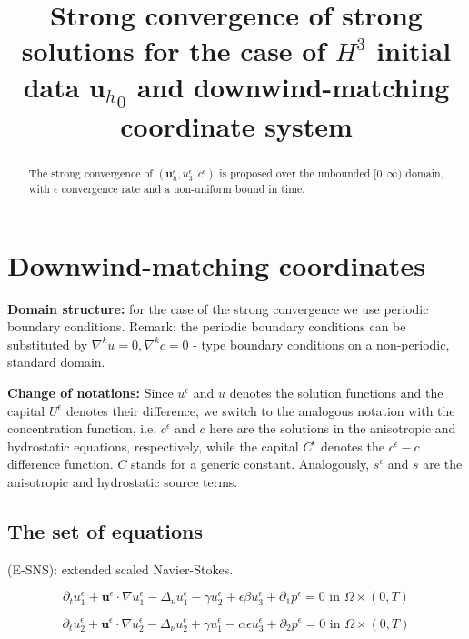 \documentclass[11pt]{article}
\title{Strong convergence of strong solutions for the case of $H^3$ initial data ${\mathbf{u}_h}_0$ and downwind-matching coordinate system}
\date{}
\begin{document}
\maketitle

\begin{abstract}

The strong convergence of $(\mathbf{u}_h^\epsilon, u_3^\epsilon, c^\epsilon)$ is proposed over the unbounded $[0, \infty)$ domain, with $\epsilon$ convergence rate and a non-uniform bound in time.

\end{abstract}

\newpage
\tableofcontents
\newpage

\section{Downwind-matching coordinates}

\textbf{Domain structure:} for the case of the strong convergence we use periodic boundary conditions. Remark: the periodic boundary conditions can be substituted by $\nabla^k u = 0, \nabla^k c = 0$ - type boundary conditions on a non-periodic, standard domain.

\textbf{Change of notations:} Since $u^\epsilon$ and $u$ denotes the solution functions and the capital $U^\epsilon$ denotes their difference, we switch to the analogous notation with the concentration function, i.e. $c^\epsilon$ and $c$ here are the solutions in the anisotropic and hydrostatic equations, respectively, while the capital $C^\epsilon$ denotes the $c^\epsilon - c$ difference function. $C$ stands for a generic constant. Analogously, $s^\epsilon$ and $s$ are the anisotropic and hydrostatic source terms.

\subsection{The set of equations}

(E-SNS): extended scaled Navier-Stokes.

    \begin{equation} \label{ANSC1-dw}
    \partial_t u^\epsilon _1 + \mathbf{u}^\epsilon \cdot \nabla u^\epsilon _1 -\Delta_\nu u^\epsilon _1 -\gamma u_2^\epsilon + \epsilon \beta u_3^\epsilon + \partial_1 p^\epsilon = 0 \text{ in } \Omega \times (0,T)
    \end{equation}
    
    \begin{equation} \label{ANSC2-dw}
    \partial_t u_2^\epsilon + \mathbf{u}^\epsilon \cdot \nabla u_2^\epsilon -\Delta_\nu u_2^\epsilon + \gamma u_1^\epsilon  - \alpha \epsilon u^\epsilon_3 + \partial_2 p^\epsilon = 0 \text{ in } \Omega \times (0,T)
    \end{equation}
    
\end{document}
